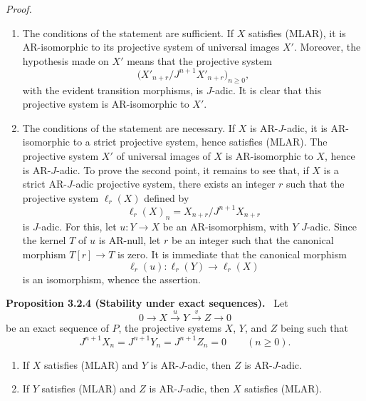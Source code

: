 \documentclass[11pt]{article}
\newenvironment{statement}[1]{\par\medskip\noindent\textbf{#1.}\ }{\par\medskip}
\newenvironment{prooftext}[1][Proof]{\par\noindent\emph{#1.}\ }{\par\medskip}
\begin{document}
\begin{prooftext}[Proof]
\begin{enumerate}[label=(\alph*)]
\item The conditions of the statement are sufficient. If $X$ satisfies (MLAR), it is AR-isomorphic to its projective system of universal images $X'$. Moreover, the hypothesis made on $X'$ means that the projective system
\[
\bigl(X'_{n+r}/J^{n+1}X'_{n+r}\bigr)_{n\ge0},
\]
with the evident transition morphisms, is $J$-adic. It is clear that this projective system is AR-isomorphic to $X'$.
\item The conditions of the statement are necessary. If $X$ is AR-$J$-adic, it is AR-isomorphic to a strict projective system, hence satisfies (MLAR). The projective system $X'$ of universal images of $X$ is AR-isomorphic to $X$, hence is AR-$J$-adic. To prove the second point, it remains to see that, if $X$ is a strict AR-$J$-adic projective system, there exists an integer $r$ such that the projective system $\ell_r(X)$ defined by
\[
\ell_r(X)_n=X_{n+r}/J^{n+1}X_{n+r}
\]
is $J$-adic. For this, let $u:Y\to X$ be an AR-isomorphism, with $Y$ $J$-adic. Since the kernel $T$ of $u$ is AR-null, let $r$ be an integer such that the canonical morphism $T[r]\to T$ is zero. It is immediate that the canonical morphism
\[
\ell_r(u):\ell_r(Y)\longrightarrow\ell_r(X)
\]
is an isomorphism, whence the assertion.
\end{enumerate}
\end{prooftext}

\begin{statement}{Proposition 3.2.4 (Stability under exact sequences)}
Let
\[
0\longrightarrow X\stackrel{u}{\longrightarrow}Y\stackrel{v}{\longrightarrow}Z\longrightarrow0
\]
be an exact sequence of $P$, the projective systems $X$, $Y$, and $Z$ being such that
\[
J^{n+1}X_n=J^{n+1}Y_n=J^{n+1}Z_n=0\qquad(n\ge0).
\]
\begin{enumerate}[label=(\roman*)]
\item If $X$ satisfies (MLAR) and $Y$ is AR-$J$-adic, then $Z$ is AR-$J$-adic.
\item If $Y$ satisfies (MLAR) and $Z$ is AR-$J$-adic, then $X$ satisfies (MLAR).
\end{enumerate}
\end{statement}
\end{document}
